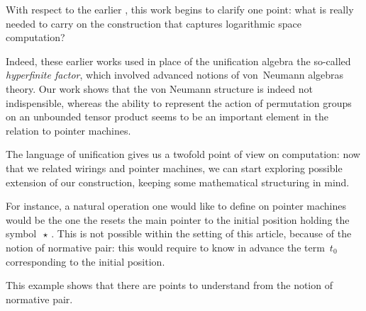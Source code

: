 With respect to the earlier \cite{girard_normativity_2012,aubert_characterizing_2012,seiller_logarithmic_2013}, this work begins to clarify one point: what is really needed to carry on the construction that captures logarithmic space computation?

Indeed, these earlier works used in place of the unification algebra the so-called \emph{hyperfinite factor}, which involved advanced notions of von~Neumann algebras theory. Our work shows that the von Neumann structure is indeed not indispensible, whereas the ability to represent the action of permutation groups on an unbounded tensor product seems to be an important element in the relation to pointer machines.

\smallskip
The language of unification gives us a twofold point of view on computation: now that we related wirings and pointer machines, we can start exploring possible extension of our construction, keeping some mathematical structuring in mind.

For instance, a natural operation one would like to define on pointer machines would be the one the resets the main pointer to the initial position holding the symbol $\,\star\,$. This is not possible within the setting of this article, because of the notion of normative pair: this would require to know in advance the term $\,t_0\,$ corresponding to the initial position.

\smallskip
This example shows that there are points to understand from the notion of normative pair. 
